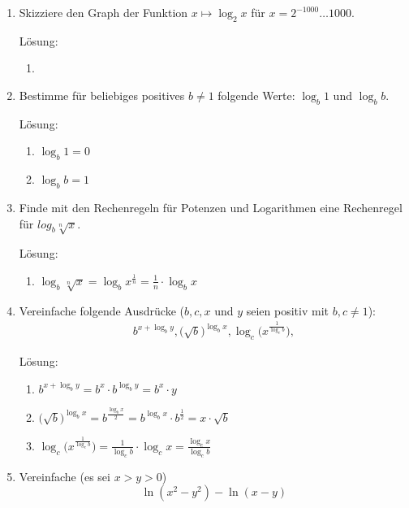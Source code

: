\documentclass[main.tex]{subfiles}
\begin{document}
\begin{enumerate}
	\item Skizziere den Graph der Funktion \( x \mapsto \log_2 x \) für \( x = 2^{-1000} \dots 1000 \).

	      Lösung:
	      \begin{enumerate}
		      \item
	      \end{enumerate}
	\item Bestimme für beliebiges positives \( b \neq 1 \) folgende Werte:
	      \( \log_b 1 \) und \( \log_b b \).

	      Lösung:
	      \begin{enumerate}
		      \item \( \log_b 1 = 0 \)
		      \item \( \log_b b = 1 \)
	      \end{enumerate}
	\item Finde mit den Rechenregeln für Potenzen und Logarithmen eine Rechenregel für \(
	      log_b \sqrt[n]{x}
	      \).

	      Lösung:
	      \begin{enumerate}
		      \item \( \log_b \sqrt[n]{x} = \log_b x^{\frac{1}{n}} = \frac{1}{n} \cdot \log_b x\)
	      \end{enumerate}
	\item Vereinfache folgende Ausdrücke (\( b, c, x \) und \( y \)
	      seien positiv mit \( b,c \neq 1 \)):
	      \begin{align*}
		      b^{x + \log_b y},
		      \Big( \sqrt{b} \Big)^{\log_b x},
		      \log_c \Big( x^{ \frac{1}{\log_c b}} \Big),
	      \end{align*}

	      Lösung:
	      \begin{enumerate}
		      \item \(  b^{x + \log_b y}
		            = b^x \cdot b^{\log_b y}
		            = b^x \cdot y \)
		      \item \( \Big( \sqrt{b} \Big)^{\log_b x}
		            = b^{\frac{ \log_b x }{ 2 }}
		            = b^{\log_b x} \cdot b^{\frac{1}{2}}
		            = x \cdot \sqrt{b} \)
		      \item \( \log_c \Big( x^{ \frac{1}{\log_c b}} \Big)
		            = \frac{1}{\log_c b} \cdot \log_c x
		            = \frac{ \log_c x}{ \log_c b} \)
	      \end{enumerate}
	\item Vereinfache (es sei \( x > y > 0 \))
	      \[  \ln(x^2 - y^2) - \ln(x - y)\]


\end{enumerate}
\end{document}
